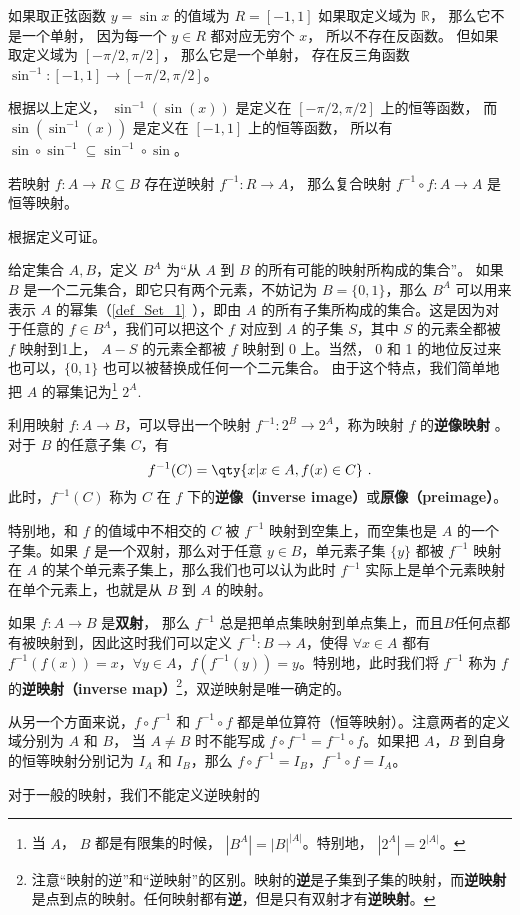 \begin{example}{}
如果取正弦函数 $y = \sin x$ 的值域为 $R = [-1, 1]$ 如果取定义域为 $\mathbb R$，  那么它不是一个单射， 因为每一个 $y \in R$ 都对应无穷个 $x$， 所以不存在反函数。 但如果取定义域为 $[-\pi/2, \pi/2]$， 那么它是一个单射， 存在反三角函数 $\sin^{-1}: [-1, 1] \to [-\pi/2, \pi/2]$。

根据以上定义， $\sin^{-1} (\sin(x))$ 是定义在 $[-\pi/2, \pi/2]$ 上的恒等函数， 而 $\sin (\sin^{-1}(x))$ 是定义在 $[-1, 1]$ 上的恒等函数， 所以有 $\sin \circ \sin^{-1} \subseteq \sin^{-1} \circ \sin$。
\end{example}

\begin{corollary}{}
若映射 $f: A  \to R \subseteq B$ 存在逆映射 $f^{-1}: R \to A$， 那么复合映射 $f^{-1} \circ f: A \to A$ 是恒等映射。
\end{corollary}
根据定义可证。


给定集合 $A, B$，定义 $B^A$ 为“从 $A$ 到 $B$ 的所有可能的映射所构成的集合”。 如果 $B$ 是一个二元集合，即它只有两个元素，不妨记为 $B=\{0,1\}$，那么 $B^A$ 可以用来表示 $A$ 的幂集（\autoref{def_Set_1}~），即由 $A$ 的所有子集所构成的集合。这是因为对于任意的 $f\in B^A$，我们可以把这个 $f$ 对应到 $A$ 的子集 $S$，其中 $S$ 的元素全都被 $f$ 映射到1上， $A-S$ 的元素全都被 $f$ 映射到 0 上。当然， 0 和 1 的地位反过来也可以，$\{0, 1\}$ 也可以被替换成任何一个二元集合。 由于这个特点，我们简单地把 $A$ 的幂集记为\footnote{当 $A$， $B$ 都是有限集的时候， $|B^A|=|B|^{|A|}$。特别地， $|2^A|=2^{|A|}$。}  $2^A$. 

利用映射 $f: A \to B$，可以导出一个映射 $f^{-1}:2^B \to 2^A$，称为映射 $f$ 的\textbf{逆像映射} 。对于 $B$ 的任意子集 $C$，有
\begin{equation}
f^{-1}(C) = \qty{x | x \in A, f(x) \in C}~.
\end{equation}
此时，$f^{-1}(C)$ 称为 $C$ 在 $f$ 下的\textbf{逆像（inverse image）}或\textbf{原像（preimage）}。

特别地，和 $f$ 的值域中不相交的 $C$ 被 $f^{-1}$ 映射到空集上，而空集也是 $A$ 的一个子集。如果 $f$ 是一个双射，那么对于任意 $y\in B$，单元素子集 $\{y\}$ 都被 $f^{-1}$ 映射在 $A$ 的某个单元素子集上，那么我们也可以认为此时 $f^{-1}$ 实际上是单个元素映射在单个元素上，也就是从 $B$ 到 $A$ 的映射。

如果 $f: A \to B$ 是\textbf{双射}， 那么 $f^{-1}$ 总是把单点集映射到单点集上，而且$B$任何点都有被映射到，因此这时我们可以定义 $f^{-1}:B \to A$，使得 $\forall x \in A$ 都有 $f^{-1}(f(x)) = x$，$\forall y \in A$，$f(f^{-1}(y)) = y$。特别地，此时我们将 $f^{-1}$ 称为 $f$ 的\textbf{逆映射（inverse map）}\footnote{注意“映射的逆”和“逆映射”的区别。映射的\textbf{逆}是子集到子集的映射，而\textbf{逆映射}是点到点的映射。任何映射都有\textbf{逆}，但是只有双射才有\textbf{逆映射}。}，双逆映射是唯一确定的。

从另一个方面来说，$f\circ f^{-1}$ 和 $f^{-1}\circ f$ 都是单位算符（恒等映射）。注意两者的定义域分别为 $A$ 和 $B$， 当 $A \ne B$ 时不能写成 $f\circ f^{-1} = f^{-1}\circ f$。如果把 $A$，$B$ 到自身的恒等映射分别记为 $I_A$ 和 $I_B$，那么 $f\circ f^{-1}=I_B$，$f^{-1}\circ f=I_A$。

对于一般的映射，我们不能定义逆映射的

